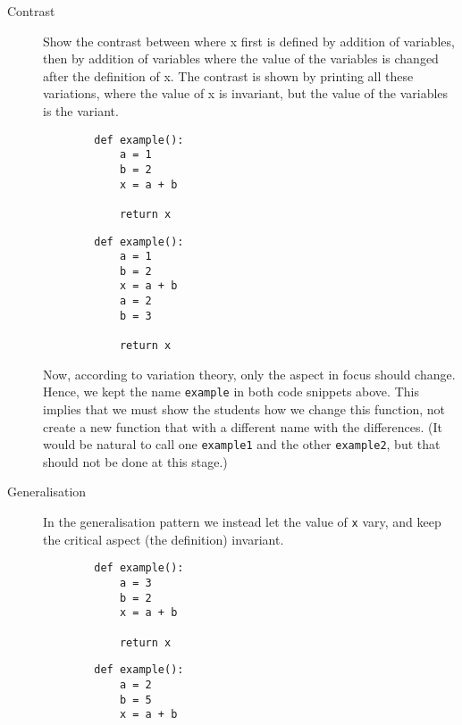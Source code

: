 \begin{description}
    \item [Contrast] Show the contrast between where x first is defined by 
addition of variables, then by addition of variables where the value 
of the variables is changed after the definition of x. The contrast is 
shown by printing all these variations, where the value of x is 
invariant, but the value of the variables is the variant. 

    \hfill
\begin{minipage}[t]{0.45\columnwidth}
    \begin{verbatim}
        def example():
            a = 1
            b = 2
            x = a + b

            return x
    \end{verbatim}
\end{minipage}
\hfill
\begin{minipage}[t]{0.45\columnwidth}
    \begin{verbatim}
        def example():
            a = 1
            b = 2
            x = a + b
            a = 2
            b = 3

            return x
  \end{verbatim}
\end{minipage}
\newline

    Now, according to variation theory, only the aspect in focus should 
change.
    Hence, we kept the name \texttt{example} in both code 
snippets 
    above.
    This implies that we must show the students how we change this 
function, 
    not create a new function that with a different name with the 
differences.
    (It would be natural to call one \texttt{example1} and the 
    other \texttt{example2}, but that should not be done at 
this 
    stage.)

    \item [Generalisation] In the generalisation pattern we instead let 
the value of \texttt{x} vary, and keep the critical aspect 
(the definition) invariant. 
    
\hfill
    \begin{minipage}[t]{0.45\columnwidth}
    \begin{verbatim}
        def example():
            a = 3
            b = 2
            x = a + b

            return x
    \end{verbatim}
\end{minipage}
\hfill
\begin{minipage}[t]{0.45\columnwidth}
    \begin{verbatim}
        def example():
            a = 2
            b = 5
            x = a + b


\end{verbatim}
\end{minipage}
\end{description}
